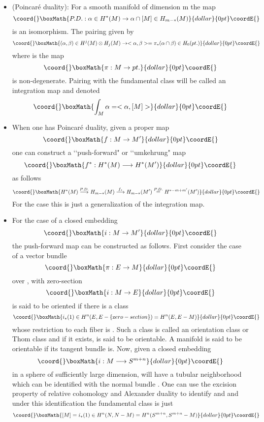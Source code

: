 \documentclass[a4paper,a4paper]{article}
\theoremstyle{conjecture}
\begin{document}
\begin{itemize}
\item (Poincar\'e duality): For \coordHE{} a smooth manifold of dimension m the map
$$\coord{}\boxMath{P.D.:\alpha \in H^*(M)\rightarrow \alpha\cap [M]\in H_{m-*}(M)}{dollar}{0pt}\coordE{}$$
is an isomorphism.  The pairing \myHighlight{$<\alpha, \beta>$}\coordHE{} given by 
$$\coord{}\boxMath{(\alpha, \beta)\in H^j(M)\otimes H_{j}(M)\rightarrow <\alpha, \beta>=\pi_*(\alpha\cap\beta)\in H_0(pt.)}{dollar}{0pt}\coordE{}$$
where \myHighlight{$\pi$}\coordHE{} is the map
$$\coord{}\boxMath{\pi:M\rightarrow pt.}{dollar}{0pt}\coordE{}$$
is non-degenerate. Pairing with the fundamental class will be called an integration map
and denoted
$$\coord{}\boxMath{\int_M \alpha = <\alpha,[M]>}{dollar}{0pt}\coordE{}$$

\item When one has Poincar\'e duality, given a proper map
$$\coord{}\boxMath{f:M\rightarrow M^\prime}{dollar}{0pt}\coordE{}$$
one can construct a \lq\lq push-forward" or \lq\lq umkehrung" map
$$\coord{}\boxMath{f^*:H^*(M)\longrightarrow H^*(M^\prime)}{dollar}{0pt}\coordE{}$$
as follows
$$\coord{}\boxMath{H^*(M)\stackrel{P.D.}\longrightarrow
H_{m-*}(M)\stackrel{f_*}\longrightarrow H_{m-*}(M^\prime)\stackrel{P.D.}
=H^{*-m+m^\prime}(M^\prime)}{dollar}{0pt}\coordE{}$$
For the case \coordHE{} this is just a generalization of the integration map.

\item For the case of a closed embedding 
$$\coord{}\boxMath{i:M\rightarrow M^\prime}{dollar}{0pt}\coordE{}$$
the push-forward map \coordHE{} can be constructed as follows.  First consider the case
of a vector bundle 
$$\coord{}\boxMath{\pi:E\rightarrow M}{dollar}{0pt}\coordE{}$$
over \coordHE{}, with zero-section
$$\coord{}\boxMath{i:M\rightarrow E}{dollar}{0pt}\coordE{}$$  \coordHE{} is said to be oriented if there is a class 
$$\coord{}\boxMath{i_*(1)\in H^n(E, E-\{{\text zero-section}\})= H^n(E,E-M)}{dollar}{0pt}\coordE{}$$
whose restriction to each fiber is
\coordHE{}.  Such a class
is called an orientation class or Thom class and if it exists, \coordHE{} is
said to be orientable.  A manifold is said to be orientable if its
tangent bundle is. Now, given a closed embedding                                    
$$\coord{}\boxMath{i:M\longrightarrow S^{m+n}}{dollar}{0pt}\coordE{}$$
in a sphere of sufficiently large dimension, \coordHE{} will have a
tubular neighborhood which can be identified with the normal
bundle \coordHE{}. One can use the excision
property of relative cohomology and Alexander duality to identify
\coordHE{} and \coordHE{}
and under this identification the fundamental class is just
$$\coord{}\boxMath{[M]=i_*(1)\in  H^{n}(N,N-M)=H^n(S^{m+n},S^{m+n}-M)}{dollar}{0pt}\coordE{}$$


\end{itemize}
\end{document}
